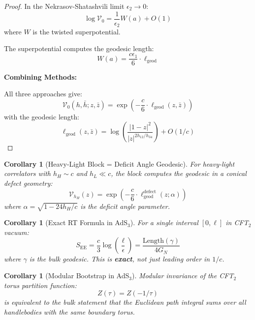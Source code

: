 \documentclass[12pt,a4paper]{article}
\newtheorem{corollary}[theorem]{Corollary}
\begin{document}
\begin{proof}
In the Nekrasov-Shatashvili limit $\epsilon_2 \to 0$:
\begin{equation}
\log \mathcal{V}_0 = \frac{1}{\epsilon_2} W(a) + O(1)
\end{equation}
where $W$ is the twisted superpotential.

The superpotential computes the geodesic length:
\begin{equation}
W(a) = \frac{c \epsilon_1}{6} \cdot \ell_{\text{geod}}
\end{equation}

\textbf{Combining Methods:}

All three approaches give:
\begin{equation}
\boxed{\mathcal{V}_0(h, \bar{h}; z, \bar{z}) = \exp\left( -\frac{c}{6} \cdot \ell_{\text{geod}}(z, \bar{z}) \right)}
\end{equation}
with the geodesic length:
\begin{equation}
\ell_{\text{geod}}(z, \bar{z}) = \log\left( \frac{|1-z|^2}{|z|^{2h_{12}/h_{34}}} \right) + O(1/c)
\end{equation}
\end{proof}

\begin{corollary}[Heavy-Light Block = Deficit Angle Geodesic]
For heavy-light correlators with $h_H \sim c$ and $h_L \ll c$, the block computes the geodesic in a conical defect geometry:
\begin{equation}
\mathcal{V}_{h_H}(z) = \exp\left( -\frac{c}{6} \cdot \ell_{\text{geod}}^{\text{defect}}(z; \alpha) \right)
\end{equation}
where $\alpha = \sqrt{1 - 24h_H/c}$ is the deficit angle parameter.
\end{corollary}

\begin{corollary}[Exact RT Formula in AdS$_3$]
For a single interval $[0, \ell]$ in CFT$_2$ vacuum:
\begin{equation}
S_{\text{EE}} = \frac{c}{3}\log\left(\frac{\ell}{\epsilon}\right) = \frac{\text{Length}(\gamma)}{4G_N}
\end{equation}
where $\gamma$ is the bulk geodesic. This is \textbf{exact}, not just leading order in $1/c$.
\end{corollary}

\begin{corollary}[Modular Bootstrap in AdS$_3$]
Modular invariance of the CFT$_2$ torus partition function:
\begin{equation}
Z(\tau) = Z(-1/\tau)
\end{equation}
is equivalent to the bulk statement that the Euclidean path integral sums over all handlebodies with the same boundary torus.
\end{corollary}
\end{document}
